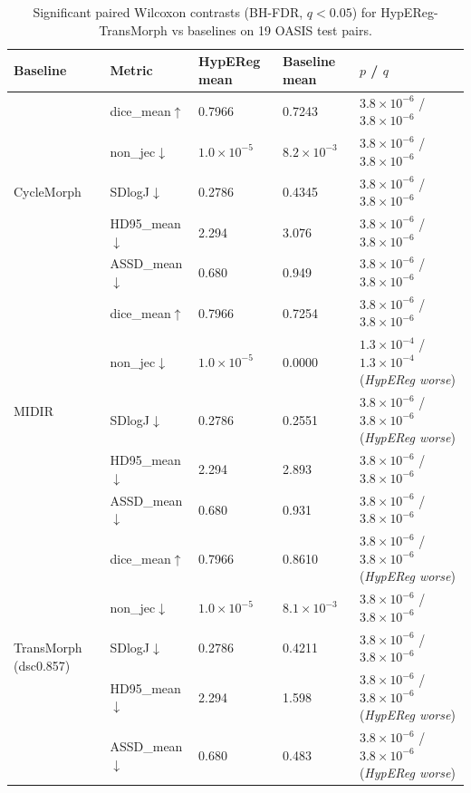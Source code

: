 \documentclass[11pt,a4paper]{article}
\begin{document}
\begin{table}[H]
\caption{Significant paired Wilcoxon contrasts (BH-FDR, $q<0.05$) for HypEReg-TransMorph vs baselines on 19 OASIS test pairs.\label{tab:s5_oasis_wilcoxon}}
\centering
\scriptsize
\setlength{\tabcolsep}{4pt}
\begin{tabularx}{\textwidth}{llXXX}
\toprule
\textbf{Baseline} & \textbf{Metric} & \textbf{HypEReg mean} & \textbf{Baseline mean} & \textbf{$p$ / $q$} \\
\midrule
\multirow{5}{*}{CycleMorph} & dice\_mean\(\uparrow\) & 0.7966 & 0.7243 & $3.8\times10^{-6}$ / $3.8\times10^{-6}$ \\
 & non\_jec\(\downarrow\) & $1.0\times10^{-5}$ & $8.2\times10^{-3}$ & $3.8\times10^{-6}$ / $3.8\times10^{-6}$ \\
 & SDlogJ\(\downarrow\) & 0.2786 & 0.4345 & $3.8\times10^{-6}$ / $3.8\times10^{-6}$ \\
 & HD95\_mean\(\downarrow\) & 2.294 & 3.076 & $3.8\times10^{-6}$ / $3.8\times10^{-6}$ \\
 & ASSD\_mean\(\downarrow\) & 0.680 & 0.949 & $3.8\times10^{-6}$ / $3.8\times10^{-6}$ \\
\midrule
\multirow{5}{*}{MIDIR} & dice\_mean\(\uparrow\) & 0.7966 & 0.7254 & $3.8\times10^{-6}$ / $3.8\times10^{-6}$ \\
 & non\_jec\(\downarrow\) & $1.0\times10^{-5}$ & 0.0000 & $1.3\times10^{-4}$ / $1.3\times10^{-4}$ (\emph{HypEReg worse}) \\
 & SDlogJ\(\downarrow\) & 0.2786 & 0.2551 & $3.8\times10^{-6}$ / $3.8\times10^{-6}$ (\emph{HypEReg worse}) \\
 & HD95\_mean\(\downarrow\) & 2.294 & 2.893 & $3.8\times10^{-6}$ / $3.8\times10^{-6}$ \\
 & ASSD\_mean\(\downarrow\) & 0.680 & 0.931 & $3.8\times10^{-6}$ / $3.8\times10^{-6}$ \\
\midrule
\multirow{5}{*}{TransMorph (dsc0.857)} & dice\_mean\(\uparrow\) & 0.7966 & 0.8610 & $3.8\times10^{-6}$ / $3.8\times10^{-6}$ (\emph{HypEReg worse}) \\
 & non\_jec\(\downarrow\) & $1.0\times10^{-5}$ & $8.1\times10^{-3}$ & $3.8\times10^{-6}$ / $3.8\times10^{-6}$ \\
 & SDlogJ\(\downarrow\) & 0.2786 & 0.4211 & $3.8\times10^{-6}$ / $3.8\times10^{-6}$ \\
 & HD95\_mean\(\downarrow\) & 2.294 & 1.598 & $3.8\times10^{-6}$ / $3.8\times10^{-6}$ (\emph{HypEReg worse}) \\
 & ASSD\_mean\(\downarrow\) & 0.680 & 0.483 & $3.8\times10^{-6}$ / $3.8\times10^{-6}$ (\emph{HypEReg worse}) \\

\end{tabularx}
\end{table}
\end{document}
